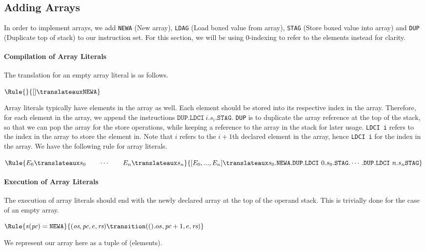 \subsection{Adding Arrays}

In order to implement arrays, we add \texttt{NEWA} (New array),
\texttt{LDAG} (Load boxed value from array),
\texttt{STAG} (Store boxed value into array) and \texttt{DUP}
(Duplicate top of stack) to our instruction set. For this section,
we will be using 0-indexing to refer to the elements instead for clarity.

\paragraph{Compilation of Array Literals}
The translation for an empty array literal is as follows.

$\Rule{}{\lbrack\rbrack \translateaux \texttt{NEWA}}$

Array literals typically have elements in the array as well.
Each element should be stored into its respective index in the array.
Therefore, for each element in the array, we append the instructions
$\texttt{DUP}.\texttt{LDCI}\ i.s_i.\texttt{STAG}$.
\texttt{DUP} is to duplicate the
array reference at the top of the stack, so that we can pop the array
for the store operations, while keeping a reference to the array in
the stack for later usage. \texttt{LDCI i} refers to the index in the array
to store the element in. Note that $i$ refers to the $i+1$th declared element
in the array, hence \texttt{LDCI i} for the index in the array.
We have the following rule for array literals.

$\Rule{E_0 \translateaux s_0 \qquad \cdots \qquad E_n \translateaux s_n}{
\lbrack E_0, ..., E_n\rbrack \translateaux s_0. \texttt{NEWA}.\texttt{DUP}
.\texttt{LDCI}\ 0.s_0.\texttt{STAG}. \cdots .\texttt{DUP}
.\texttt{LDCI}\ n.s_n\texttt{STAG}}
$

\paragraph{Execution of Array Literals}
The execution of array literals should end with the newly declared
array at the top of the operand stack. This is trivially done for the
case of an empty array.

$\Rule{s(\textit{pc}) = \texttt{NEWA}}{
(\textit{os},\textit{pc},e,\textit{rs}) \transition
(().os,\textit{pc}+1,e,\textit{rs})}
$

We represent our array here as a tuple of (elements).

